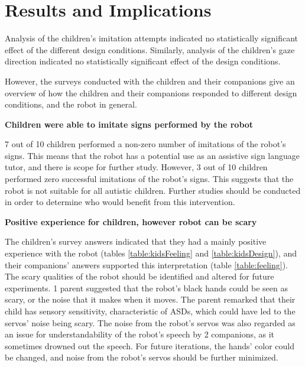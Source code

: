 
\section{Results and Implications}

Analysis of the children's imitation attempts indicated no statistically significant effect of the different design conditions. Similarly, analysis of the children's gaze direction indicated no statistically significant effect of the design conditions.

However, the surveys conducted with the children and their companions give an overview of how the children and their companions responded to different design conditions, and the robot in general.

\vspace{3mm}
\noindent\textbf{Children were able to imitate signs performed by the robot}

7 out of 10 children performed a non-zero number of imitations of the robot's signs. This means that the robot has a potential use as an assistive sign language tutor, and there is scope for further study. However, 3 out of 10 children performed zero successful imitations of the robot's signs. This suggests that the robot is not suitable for all autistic children. Further studies should be conducted in order to determine who would benefit from this intervention.


\vspace{3mm}
\noindent\textbf{Positive experience for children, however robot can be scary}

The children's survey answers indicated that they had a mainly positive experience with the robot (tables \ref{table:kidsFeeling} and \ref{table:kidsDesign}), and their companions' answers supported this interpretation (table \ref{table:feeling}). The scary qualities of the robot should be identified and altered for future experiments. 1 parent suggested that the robot's black hands could be seen as scary, or the noise that it makes when it moves. The parent remarked that their child has sensory sensitivity, characteristic of ASDs, which could have led to the servos' noise being scary. The noise from the robot's servos was also regarded as an issue for understandability of the robot's speech by 2 companions, as it sometimes drowned out the speech. For future iterations, the hands' color could be changed, and noise from the robot's servos should be further minimized.

